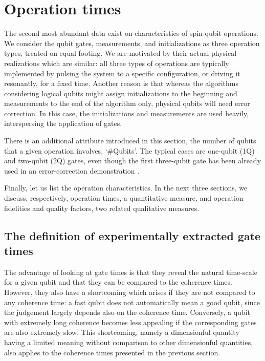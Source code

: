 \documentclass[aps, prx, showpacs, twocolumn, superscriptaddress, notitlepage, longbibliography, floatfix, nofootinbib]{revtex4-2}
\newcommand{\myKey}[1]{$\whitearrowupfrombar$\textit{#1}}
\renewcommand{\myKey}[1]{\textit{#1}}
\renewcommand{\myKey}[1]{`{#1}'}
\newcommand{\recheck}[1]{{#1}}
\begin{document}
\section{Operation times}

\label{sec:operations}

The second most abundant data exist on characteristics of spin-qubit operations. We consider the qubit gates, measurements, and initializations as three operation types, treated on equal footing.
We are motivated by their actual physical realizations which are similar: all three types of operations are typically implemented by pulsing the system to a specific configuration, or driving it resonantly, for a fixed time. Another reason is that whereas the algorithms considering logical qubits might assign initializations to the beginning and measurements to the end of the algorithm only, physical qubits will need error correction. In this case, the initializations and measurements are used heavily, interspersing the application of gates.


There is an additional attribute introduced in this section, the number of qubits that a given operation involves, \myKey{\#Qubits}. \recheck{The typical cases are one-qubit (1Q) and two-qubit (2Q) gates, even though the first three-qubit gate has been already used in an error-correction demonstration \cite{takeda_quantum_2022}. 
}

Finally, let us list the operation characteristics. In the next three sections, we discuss, respectively, operation times, a quantitative measure, and operation fidelities and quality factors, two related qualitative measures. 


\subsection{The definition of experimentally extracted gate times}

The advantage of looking at gate times is that they reveal the natural time-scale for a given qubit and that they can be compared to the coherence times. However, they also have a shortcoming which arises if they are not compared to any coherence time: a fast qubit does not automatically mean a good qubit, since the judgement largely depends also on the coherence time. Conversely, a qubit with extremely long coherence becomes less appealing if the corresponding gates are also extremely slow. This shortcoming, namely a dimensionful quantity having a limited meaning without comparison to other dimensionful quantities, also applies to the coherence times presented in the previous section. 
\end{document}
